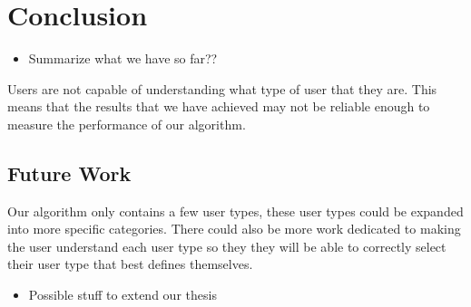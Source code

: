 \chapter{Conclusion}\label{ch:conclusion}

\begin{itemize}
\item Summarize what we have so far??
\end{itemize}

Users are not capable of understanding what type of user that they are. This means that the results that we have achieved may not be reliable enough to measure the performance of our algorithm. 

\section{Future Work}
 
Our algorithm only contains a few user types, these user types could be expanded into more specific categories. There could also be more work dedicated to making the user understand each user type so they they will be able to correctly select their user type that best defines themselves.

\begin{itemize}
\item Possible stuff to extend our thesis
\end{itemize}
